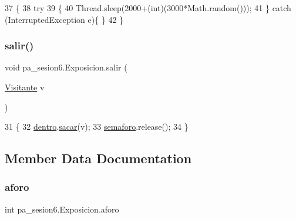 \begin{DoxyCode}
37     \{
38         \textcolor{keywordflow}{try}
39         \{
40             Thread.sleep(2000+(\textcolor{keywordtype}{int})(3000*Math.random()));
41         \} \textcolor{keywordflow}{catch} (InterruptedException e)\{ \}
42     \}
\end{DoxyCode}
\mbox{\label{classpa__sesion6_1_1_exposicion_af3dad6816f86cb8fccc96b5347820a8d}} 
\subsubsection{\texorpdfstring{salir()}{salir()}}
{\footnotesize\ttfamily void pa\+\_\+sesion6.\+Exposicion.\+salir (\begin{DoxyParamCaption}\item[{\mbox{\hyperlink{classpa__sesion6_1_1_visitante}{Visitante}}}]{v }\end{DoxyParamCaption})\hspace{0.3cm}{\ttfamily [inline]}}


\begin{DoxyCode}
31     \{
32         \mbox{\hyperlink{classpa__sesion6_1_1_exposicion_ab6a124ffce7020f2703c668f813c557a}{dentro}}.\mbox{\hyperlink{classpa__sesion6_1_1_lista_threads_a750595ae1fea92fc8270776a0aebaa58}{sacar}}(v);
33         \mbox{\hyperlink{classpa__sesion6_1_1_exposicion_a85f365853b70ab8959d994128fd1b30a}{semaforo}}.release();
34     \}
\end{DoxyCode}


\subsection{Member Data Documentation}
\mbox{\label{classpa__sesion6_1_1_exposicion_afcbdc68d946761e186c8403f72a868f5}} 
\subsubsection{\texorpdfstring{aforo}{aforo}}
{\footnotesize\ttfamily int pa\+\_\+sesion6.\+Exposicion.\+aforo\hspace{0.3cm}{\ttfamily [package]}}

